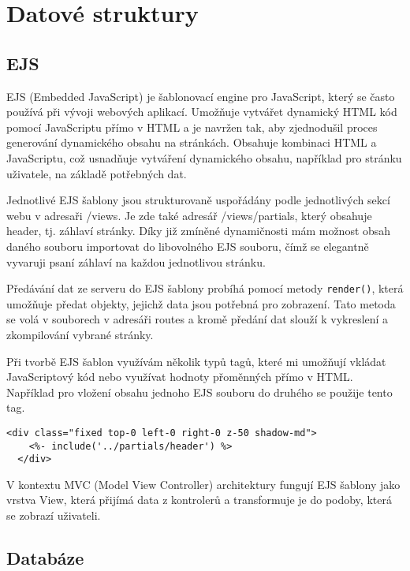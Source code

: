 \section{Datové struktury}

\subsection{EJS}

\par EJS (Embedded JavaScript) je šablonovací engine pro JavaScript, který se často používá při vývoji webových aplikací. Umožňuje vytvářet dynamický HTML kód pomocí JavaScriptu přímo v HTML a je navržen tak, aby zjednodušil proces generování dynamického obsahu na stránkách. Obsahuje kombinaci HTML a JavaScriptu, což usnadňuje vytváření dynamického obsahu, například pro stránku uživatele, na základě potřebných dat.
\par Jednotlivé EJS šablony jsou strukturovaně uspořádány podle jednotlivých sekcí webu v adresaři /views. Je zde také adresář  /views/partials, který obsahuje header, tj. záhlaví stránky. Díky již zmíněné dynamičnosti mám možnost obsah daného souboru importovat do libovolného EJS souboru, čímž se elegantně vyvaruji psaní záhlaví na každou jednotlivou stránku.
\par Předávání dat ze serveru do EJS šablony probíhá pomocí metody \texttt{render()}, která umožňuje předat objekty, jejichž data jsou potřebná pro zobrazení. Tato metoda se volá v souborech v adresáři routes a kromě předání dat slouží k vykreslení a zkompilování vybrané stránky.
\par Při tvorbě EJS šablon využívám několik typů tagů, které mi umožňují vkládat JavaScriptový kód nebo využívat hodnoty přoměnných přímo v HTML. Například pro vložení obsahu jednoho EJS souboru do druhého se použije tento tag.
\begin{lstlisting}[caption = {EJS tag s include atributem},label = {lst:stranka}]
  <div class="fixed top-0 left-0 right-0 z-50 shadow-md">
    <%- include('../partials/header') %>
  </div>
\end{lstlisting}
\par V kontextu MVC (Model View Controller) architektury fungují EJS šablony jako vrstva View, která přijímá data z kontrolerů a transformuje je do podoby, která se zobrazí uživateli.

\subsection{Databáze}

